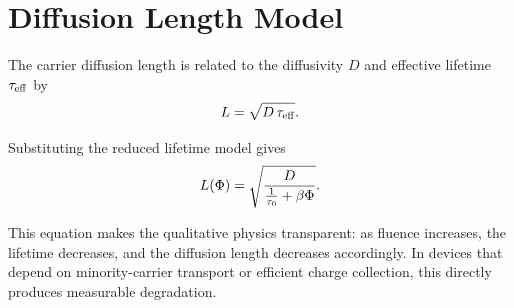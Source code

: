 \documentclass[../../project_master.tex]{subfiles}
\begin{document}
\section{Diffusion Length Model}
The carrier diffusion length is related to the diffusivity $D$ and effective lifetime $\tau_\mathrm{eff}$ by
\begin{equation}
L = \sqrt{D\,\tau_\mathrm{eff}}.
\end{equation}

Substituting the reduced lifetime model gives
\begin{equation}
L(\Phi) = \sqrt{\frac{D}{\tfrac{1}{\tau_0}+\beta \Phi}}.
\end{equation}

This equation makes the qualitative physics transparent: as fluence increases, the lifetime decreases, and the diffusion length decreases accordingly. In devices that depend on minority-carrier transport or efficient charge collection, this directly produces measurable degradation.
\end{document}
